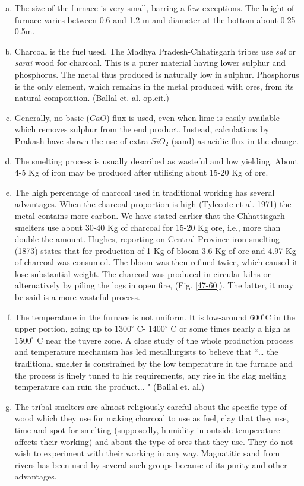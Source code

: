 \begin{enumerate}[a)]
\item The size of the furnace is very small, barring a few exceptions. The height of furnace varies between 0.6 and 1.2 m and diameter at the bottom about 0.25-0.5m.
\item Charcoal is the fuel used. The Madhya Pradesh-Chhatisgarh tribes use {\it sal} or {\it sarai} wood for charcoal. This is a purer material having lower sulphur and phosphorus. The metal thus produced is naturally low in sulphur. Phosphorus is the only element, which remains in the metal produced with ores, from its natural composition. (Ballal et. al. op.cit.)  	
\item Generally, no basic ($CaO$) flux is used, even when lime is easily available which removes sulphur from the end product. Instead, calculations by Prakash have shown the use of extra $SiO_2$ (sand) as acidic flux in the change.
\item The smelting process is usually described as wasteful and low yielding. About 4-5 Kg of iron may be produced after utilising about 15-20 Kg of ore.
\item The high percentage of charcoal used in traditional working has several advantages. When the charcoal proportion is high (Tylecote et al. 1971) the metal contains more carbon. We have stated earlier that the Chhattisgarh smelters use about 30-40 Kg of charcoal for 15-20 Kg ore, i.e., more than double the amount. Hughes, reporting on Central Province iron smelting (1873) states that for production of 1 Kg of bloom 3.6 Kg of ore and 4.97 Kg of charcoal was consumed. The bloom was then refined twice, which caused it lose substantial weight. The charcoal was produced in circular kilns or alternatively by piling the logs in open fire, (Fig. \ref{47-60}). The latter, it may be said is a more wasteful process.
\item The temperature in the furnace is not uniform. It is low-around $600^\circ$C in the upper portion, going up to $1300^\circ$ C- $1400^\circ$ C or some times nearly a high as $1500^\circ$ C near the tuyere zone. A close study of the whole production process and temperature mechanism has led metallurgists to believe that ``… the traditional smelter is constrained by the low temperature in the furnace and the process is finely tuned to his requirements, any rise in the slag melting temperature can ruin the product... " (Ballal et. al.) 
\item The tribal smelters are almost religiously careful about the specific type of wood which they use for making charcoal to use as fuel, clay that they use, time and spot for smelting (supposedly, humidity in outside temperature affects their working) and about the type of ores that they use. They do not wish to experiment with their working in any way. Magnatitic sand from rivers has been used by several such groups because of its purity and other advantages.

\end{enumerate}
